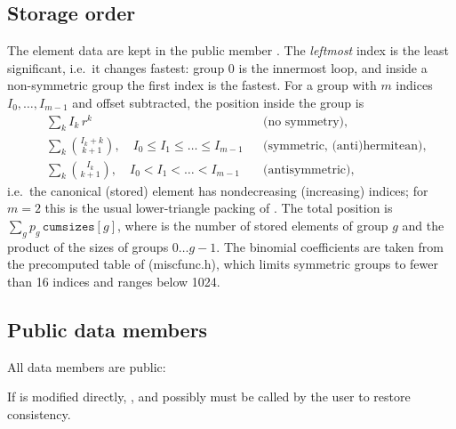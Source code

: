 \subsection{Storage order}

The element data are kept in the public member . The \emph{leftmost} index is the least
significant, i.e.\ it changes fastest: group 0 is the innermost loop, and inside a non-symmetric group
the first index is the fastest. For a group with $m$ indices $I_0,\dots,I_{m-1}$ and offset subtracted, the
position inside the group is
\begin{align*}
&\textstyle\sum_{k} I_k\, r^k && \text{(no symmetry)},\\
&\textstyle\sum_{k} \binom{I_k+k}{k+1}, \quad I_0\le I_1\le\dots\le I_{m-1} && \text{(symmetric, (anti)hermitean)},\\
&\textstyle\sum_{k} \binom{I_k}{k+1}, \quad I_0< I_1<\dots< I_{m-1} && \text{(antisymmetric)},
\end{align*}
i.e.\ the canonical (stored) element has nondecreasing (increasing) indices; for $m=2$ this is the
usual lower-triangle packing  of . The total position is
$\sum_g p_g\,\mathtt{cumsizes}[g]$, where  is the number of stored elements of group $g$
and  the product of the sizes of groups $0\dots g-1$.
The binomial coefficients are taken from the precomputed table of  (miscfunc.h),
which limits symmetric groups to fewer than 16 indices and ranges below 1024.

\subsection{Public data members}

All data members are public:
\begin{lareference}
\end{lareference}
If  is modified directly, ,  and possibly 
must be called by the user to restore consistency.


